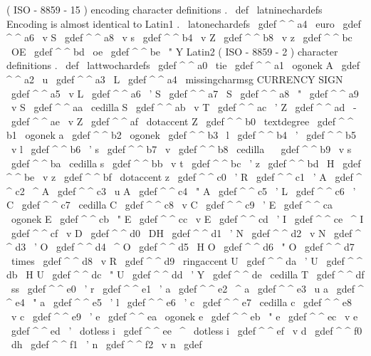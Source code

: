 {{{{(
ISO
-
8859
-
15
)
encoding
character
definitions
.
\
def
\
latninechardefs
{
%
%
Encoding
is
almost
identical
to
Latin1
.
\
latonechardefs
%
\
gdef
^
^
a4
{
\
euro
}
\
gdef
^
^
a6
{
\
v
S
}
\
gdef
^
^
a8
{
\
v
s
}
\
gdef
^
^
b4
{
\
v
Z
}
\
gdef
^
^
b8
{
\
v
z
}
\
gdef
^
^
bc
{
\
OE
}
\
gdef
^
^
bd
{
\
oe
}
\
gdef
^
^
be
{
\
"
Y
}
}
%
Latin2
(
ISO
-
8859
-
2
)
character
definitions
.
\
def
\
lattwochardefs
{
%
\
gdef
^
^
a0
{
\
tie
}
\
gdef
^
^
a1
{
\
ogonek
{
A
}
}
\
gdef
^
^
a2
{
\
u
{
}
}
\
gdef
^
^
a3
{
\
L
}
\
gdef
^
^
a4
{
\
missingcharmsg
{
CURRENCY
SIGN
}
}
\
gdef
^
^
a5
{
\
v
L
}
\
gdef
^
^
a6
{
\
'
S
}
\
gdef
^
^
a7
{
\
S
}
\
gdef
^
^
a8
{
\
"
{
}
}
\
gdef
^
^
a9
{
\
v
S
}
\
gdef
^
^
aa
{
\
cedilla
S
}
\
gdef
^
^
ab
{
\
v
T
}
\
gdef
^
^
ac
{
\
'
Z
}
\
gdef
^
^
ad
{
\
-
}
\
gdef
^
^
ae
{
\
v
Z
}
\
gdef
^
^
af
{
\
dotaccent
Z
}
%
\
gdef
^
^
b0
{
\
textdegree
}
\
gdef
^
^
b1
{
\
ogonek
{
a
}
}
\
gdef
^
^
b2
{
\
ogonek
{
}
}
\
gdef
^
^
b3
{
\
l
}
\
gdef
^
^
b4
{
\
'
{
}
}
\
gdef
^
^
b5
{
\
v
l
}
\
gdef
^
^
b6
{
\
'
s
}
\
gdef
^
^
b7
{
\
v
{
}
}
\
gdef
^
^
b8
{
\
cedilla
\
}
\
gdef
^
^
b9
{
\
v
s
}
\
gdef
^
^
ba
{
\
cedilla
s
}
\
gdef
^
^
bb
{
\
v
t
}
\
gdef
^
^
bc
{
\
'
z
}
\
gdef
^
^
bd
{
\
H
{
}
}
\
gdef
^
^
be
{
\
v
z
}
\
gdef
^
^
bf
{
\
dotaccent
z
}
%
\
gdef
^
^
c0
{
\
'
R
}
\
gdef
^
^
c1
{
\
'
A
}
\
gdef
^
^
c2
{
\
^
A
}
\
gdef
^
^
c3
{
\
u
A
}
\
gdef
^
^
c4
{
\
"
A
}
\
gdef
^
^
c5
{
\
'
L
}
\
gdef
^
^
c6
{
\
'
C
}
\
gdef
^
^
c7
{
\
cedilla
C
}
\
gdef
^
^
c8
{
\
v
C
}
\
gdef
^
^
c9
{
\
'
E
}
\
gdef
^
^
ca
{
\
ogonek
{
E
}
}
\
gdef
^
^
cb
{
\
"
E
}
\
gdef
^
^
cc
{
\
v
E
}
\
gdef
^
^
cd
{
\
'
I
}
\
gdef
^
^
ce
{
\
^
I
}
\
gdef
^
^
cf
{
\
v
D
}
%
\
gdef
^
^
d0
{
\
DH
}
\
gdef
^
^
d1
{
\
'
N
}
\
gdef
^
^
d2
{
\
v
N
}
\
gdef
^
^
d3
{
\
'
O
}
\
gdef
^
^
d4
{
\
^
O
}
\
gdef
^
^
d5
{
\
H
O
}
\
gdef
^
^
d6
{
\
"
O
}
\
gdef
^
^
d7
{
\
times
}
\
gdef
^
^
d8
{
\
v
R
}
\
gdef
^
^
d9
{
\
ringaccent
U
}
\
gdef
^
^
da
{
\
'
U
}
\
gdef
^
^
db
{
\
H
U
}
\
gdef
^
^
dc
{
\
"
U
}
\
gdef
^
^
dd
{
\
'
Y
}
\
gdef
^
^
de
{
\
cedilla
T
}
\
gdef
^
^
df
{
\
ss
}
%
\
gdef
^
^
e0
{
\
'
r
}
\
gdef
^
^
e1
{
\
'
a
}
\
gdef
^
^
e2
{
\
^
a
}
\
gdef
^
^
e3
{
\
u
a
}
\
gdef
^
^
e4
{
\
"
a
}
\
gdef
^
^
e5
{
\
'
l
}
\
gdef
^
^
e6
{
\
'
c
}
\
gdef
^
^
e7
{
\
cedilla
c
}
\
gdef
^
^
e8
{
\
v
c
}
\
gdef
^
^
e9
{
\
'
e
}
\
gdef
^
^
ea
{
\
ogonek
{
e
}
}
\
gdef
^
^
eb
{
\
"
e
}
\
gdef
^
^
ec
{
\
v
e
}
\
gdef
^
^
ed
{
\
'
{
\
dotless
{
i
}
}
}
\
gdef
^
^
ee
{
\
^
{
\
dotless
{
i
}
}
}
\
gdef
^
^
ef
{
\
v
d
}
%
\
gdef
^
^
f0
{
\
dh
}
\
gdef
^
^
f1
{
\
'
n
}
\
gdef
^
^
f2
{
\
v
n
}
\
gdef
}}}}}
